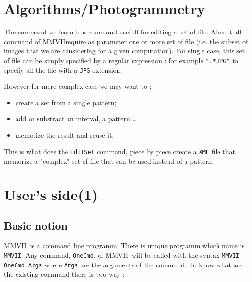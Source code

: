 \documentclass[a4paper]{book}
\newcommand{\PPP}{MMVII}
\newcommand{\CdPPP}{{\tt MMVII}}
\begin{document}
{%

\section{Algorithms/Photogrammetry}

The command we learn is a command usefull for editing a set of file.
Almost all command of \PPP require as parameter one or more set of 
file (i.e. the subset of images that we are considering for a given computation).
For single case, this set of file can be simply specified by a regular expression :
for example {\tt ".*JPG"} to specify all the file with a {\tt JPG} extension.

However for more complex case we may want to :

\begin{itemize}
   \item  create a set from a single pattern;
   \item  add or substract an interval, a pattern \dots
   \item  memorize the result and reuse it.
\end{itemize}


This is what does the  {\tt EditSet} command, piece by piece create a
{\tt XML} file that memorize a "complex" set of file that can be used
instead of a pattern.


\section{User's side(1)}


\subsection{Basic notion }

\PPP\, is a command line programm. There is unique programm which
name is \CdPPP. Any command, {\tt OneCmd}, of \PPP\, will be called with the 
syntax {\tt  \CdPPP\,  OneCmd Args} where {\tt Args} are the arguments
of the command. To know what are the existing command there is two way :

}
\end{document}

